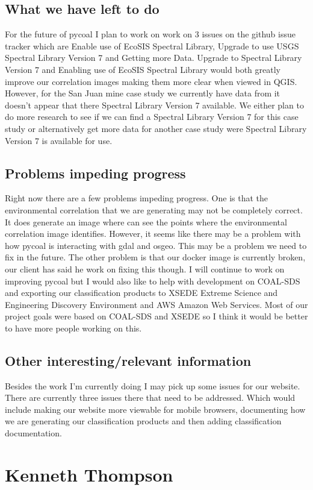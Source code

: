 \documentclass[onecolumn, draftclsnofoot,10pt, compsoc]{IEEEtran}
\begin{document}
\subsection{What we have left to do}
For the future of pycoal I plan to work on work on 3 issues on the github issue tracker which are
Enable use of EcoSIS Spectral Library, Upgrade to use USGS Spectral Library Version 7 and Getting more Data. Upgrade to Spectral Library Version 7 and Enabling use of EcoSIS Spectral Library would both greatly improve our correlation images making them more clear when viewed in QGIS. However, for the San Juan mine case study we currently have data from it doesn’t appear that there Spectral Library Version 7 available. We either plan to do more research to see if we can find a Spectral Library Version 7 for this case study or alternatively get more data for another case study were Spectral Library Version 7 is available for use.

\subsection{Problems impeding progress}
Right now there are a few problems impeding progress. One is that the environmental correlation that we are generating may not be completely correct. It does generate an image where can see the points where the environmental correlation image identifies. However, it seems like there may be a problem with how pycoal is interacting with gdal and osgeo. This may be a problem we need to fix in the future. The other problem is that our docker image is currently broken, our client has said he work on fixing this though. I will continue to work on improving pycoal but I would also like to help with development on COAL-SDS and exporting our classification products to XSEDE Extreme Science and Engineering Discovery Environment and AWS Amazon Web Services. Most of our project goals were based on COAL-SDS and XSEDE so I think it would be better to have more people working on this.
\subsection{Other interesting/relevant information}
Besides the work I’m currently doing I may pick up some issues for our website. There are currently three issues there that need to be addressed. Which would include making our website more viewable for mobile browsers, documenting how we are generating our classification products and then adding classification documentation.
\section{Kenneth Thompson}
\end{document}
